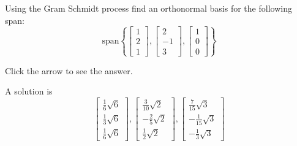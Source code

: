 \documentclass{ximera}
\begin{document}
\begin{problem}\label{prob:use_GS_on_span}
Using the Gram Schmidt process find an
orthonormal basis for the following span:
 \[
\mbox{span} \left\{ \left[
\begin{array}{r}
1 \\
2 \\
1
\end{array}
\right] ,\left[
\begin{array}{r}
2 \\
-1 \\
3
\end{array}
\right] , \left[
\begin{array}{r}
1 \\
0 \\
0
\end{array}
\right] \right\}
\]

Click the arrow to see the answer.
\begin{expandable}
A solution is
\[
\left[
\begin{array}{c}
\frac{1}{6}\sqrt{6} \\
\frac{1}{3}\sqrt{6} \\
\frac{1}{6}\sqrt{6}
\end{array}
\right] ,\left[
\begin{array}{c}
\frac{3}{10}\sqrt{2} \\
-\frac{2}{5}\sqrt{2} \\
\frac{1}{2}\sqrt{2}
\end{array}
\right] ,\left[
\begin{array}{c}
\frac{7}{15}\sqrt{3} \\
-\frac{1}{15}\sqrt{3} \\
-\frac{1}{3}\sqrt{3}
\end{array}
\right]
\]
\end{expandable}
\end{problem}
\end{document}
